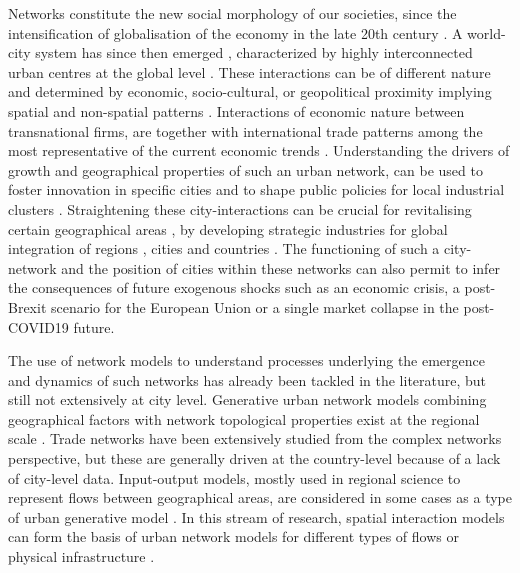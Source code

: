 \documentclass[10pt,letterpaper]{article}
\begin{document}
Networks constitute the new social morphology of our societies, since the intensification of globalisation of the economy in the late 20th century \cite{castells2000networksociety}. A world-city system has since then emerged \cite{taylor2001specification}, characterized by highly interconnected urban centres at the global level \cite{sassen1991}. These interactions can be of different nature and determined by economic, socio-cultural, or geopolitical proximity implying spatial and non-spatial patterns \cite{martinus2018global}. Interactions of economic nature between transnational firms, are together with international trade patterns among the most representative of the current economic trends \cite{taylor2001specification}. Understanding the drivers of growth and geographical properties of such an urban network, can be used to foster innovation in specific cities and to shape public policies for local industrial clusters \cite{turkina2016structure}. Straightening these city-interactions can be crucial for revitalising certain geographical areas \cite{Clarke2018}, by developing strategic industries for global integration of regions \cite{dawley2019creating}, cities \cite{gluckler2016relational} and countries \cite{martinus2019brokerage}. The functioning of such a city-network and the position of cities within these networks \cite{gluckler2016relational} can also permit to infer the consequences of future exogenous shocks such as an economic crisis, a post-Brexit scenario for the European Union or a single market collapse in the post-COVID19 future.

The use of network models to understand processes underlying the emergence and dynamics of such networks has already been tackled in the literature, but still not extensively at city level. Generative urban network models combining geographical factors with network topological properties exist at the regional scale {\cite{dai2016simulating}}. %
Trade networks have been extensively studied from the complex networks perspective, but these are generally driven at the country-level \cite{garlaschelli2005structure} because of a lack of city-level data. Input-output models, mostly used in regional science to represent flows between geographical areas, are considered in some cases as a type of urban generative model \cite{jin1993generation}. In this stream of research, spatial interaction models \cite{dennett2013multilevel} can form the basis of urban network models for different types of flows \cite{dai2016generative} or physical infrastructure \cite{raimbault2018indirect}.
\end{document}
